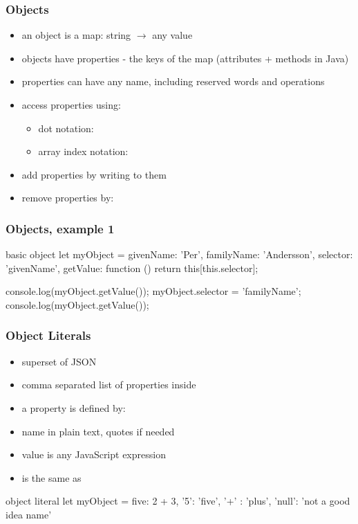 \begin{frame}[fragile] \frametitle{Objects}
\begin{itemize}
  \item an object is a map: string $\rightarrow$ any value
  \item objects have properties - the keys of the map (attributes + methods in Java)
  \item properties can have any name, including reserved words and operations
  \item access properties using:
  \begin{itemize}
    \item dot notation: 
    \item array index notation: 
  \end{itemize}
  \item add properties by writing to them 
  \item remove properties by: 
\end{itemize}
\end{frame}

\begin{frame}[fragile] \frametitle{Objects, example 1}
 \begin{CodeBox}{basic object}
let myObject = {
  givenName: 'Per',
  familyName: 'Andersson',
  selector: 'givenName',
  getValue: function () {
    return this[this.selector];
  }
}
 
console.log(myObject.getValue());
myObject.selector = 'familyName';
console.log(myObject.getValue());
 \end{CodeBox}
\end{frame}

\begin{frame}[fragile] \frametitle{Object Literals}
\begin{itemize}
  \item superset of JSON
  \item comma separated list of properties inside \code{\{ \}}
  \item a property is defined by: 
  \item name in plain text, quotes if needed 
  \item value is any JavaScript expression
  \item {} is the same as 
\end{itemize}
\begin{CodeBox}{object literal}
let myObject = {
  five: 2 + 3,
  '5': 'five',
  '+' : 'plus',
  'null': 'not a good idea name'
 }
\end{CodeBox}
\end{frame}


